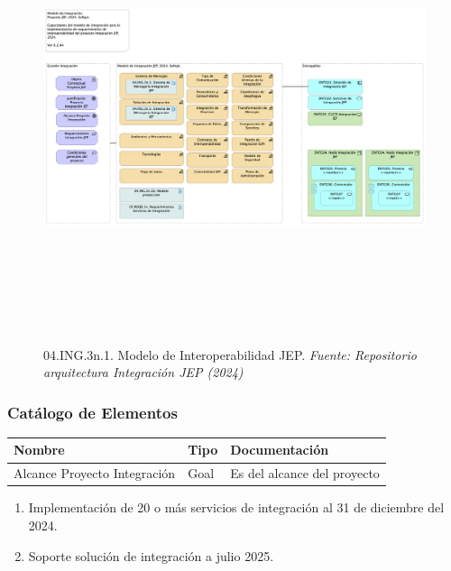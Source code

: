 \documentclass[
  paper=a4,
  ,captions=tableheading
]{scrartcl}
\providecommand{\tightlist}{%
  \setlength{\itemsep}{0pt}\setlength{\parskip}{0pt}}
\begin{document}
\begin{figure}
\centering
\includegraphics[width=\textwidth,height=5.20833in]{images/04.ING.3n.1.ModelodeInteroperabilidadJEP.png}
\caption{04.ING.3n.1. Modelo de Interoperabilidad JEP. \emph{Fuente:
Repositorio arquitectura Integración JEP
(2024)}}\label{fig:id-f863abde3ea94046a77bf84d5cb0a3a8}
\end{figure}

\subsubsection{Catálogo de
Elementos}\label{sec:catuxe1logo-de-elementos-3}

\begin{longtable}[]{@{}lll@{}}
\toprule\noalign{}
Nombre & Tipo & Documentación \\
\midrule\noalign{}
\endhead
\bottomrule\noalign{}
\endlastfoot
Alcance Proyecto Integración & Goal & Es del alcance del proyecto \\
\end{longtable}

\begin{enumerate}
\def\labelenumi{\arabic{enumi}.}
\tightlist
\item
  Implementación de 20 o más servicios de integración al 31 de diciembre
  del 2024.
\item
  Soporte solución de integración a julio 2025.
\end{enumerate}
\end{document}
